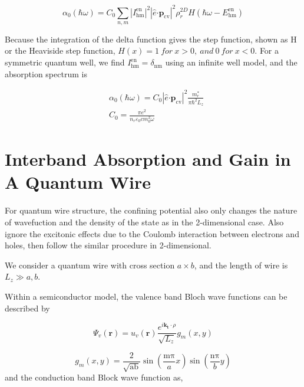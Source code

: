 \begin{equation}
\alpha_{0}\left( \hbar\omega \right) = C_{0}\sum_{n,m}^{}\left| I_{\text{hm}}^{\text{en}} \right|^{2}\left| \hat{e}\bm{\cdot}\bm{p}_{\text{cv}} \right|^{2}\rho_{r}^{2D}H(\hbar\omega - E_{\text{hm}}^{\text{en}})
\end{equation}

Because the integration of the delta function gives the step function,
shown as H or the Heaviside step function,
\(H\left( x \right) = 1\ for\ x > 0,\ and\ 0\ for\ x < 0\). For a
symmetric quantum well, we find
\(I_{\text{hm}}^{\text{en}} = \delta_{\text{nm}}\) using an infinite
well model, and the absorption spectrum is

\begin{eqnarray}
  & \alpha_{0}\left( \hbar\omega \right) = C_{0}\left| \hat{e}\bm{\cdot}\bm{p}_{\text{cv}} \right|^{2}\frac{m_{r}^{*}}{\pi\hbar^{2}L_{z}} \nonumber \\
  & C_{0} = \frac{\pi e^{2}}{n_{r}\varepsilon_{0}cm_{0}^{2}\omega}
\end{eqnarray}

\section{Interband Absorption and Gain in A Quantum
Wire}\label{interband-absorption-and-gain-in-a-quantum-wire}

For quantum wire structure, the confining potential also only changes
the nature of wavefuction and the density of the state as in the
2-dimensional case. Also ignore the
excitonic effects due to the Coulomb interaction between electrons and
holes, then follow the similar procedure in 2-dimensional.

We consider a quantum wire with cross section \(a \times b\), and the
length of wire is \(L_{z} \gg a,b\).

Within a semiconductor model, the valence band Bloch wave functions can
be described by

\begin{equation}
\Psi_{v}\left( \bm{r} \right) = u_{v}(\bm{r})\frac{e^{i\bm{k}_{\bm{t}} \cdot \rho}}{\sqrt{L_{z}}}g_{m}(x,y)
\end{equation}

\begin{equation}
g_{m}\left( x,y \right) = \frac{2}{\sqrt{\text{ab}}}\sin{(\frac{\text{mπ}}{a}x)\sin{(\frac{\text{nπ}}{b}y)}}
\end{equation}
and the conduction band Block wave function as,

